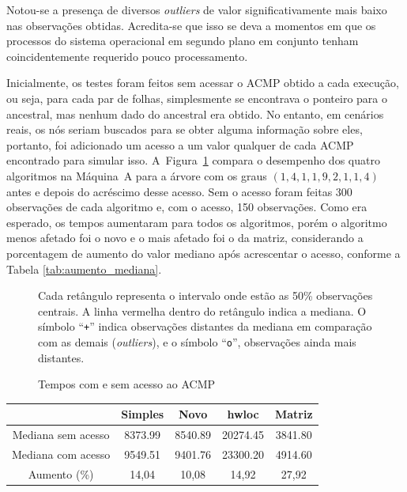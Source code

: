 
Notou-se a presença de diversos \textit{outliers} de valor significativamente mais baixo nas observações obtidas.
Acredita-se que isso se deva a momentos em que os processos do sistema operacional em segundo plano em conjunto tenham coincidentemente requerido pouco processamento.

Inicialmente, os testes foram feitos sem acessar o ACMP obtido a cada execução, ou seja, para cada par de folhas, simplesmente se encontrava o ponteiro para o ancestral, mas nenhum dado do ancestral era obtido.
No entanto, em cenários reais, os nós seriam buscados para se obter alguma informação sobre eles, portanto, foi adicionado um acesso a um valor qualquer de cada ACMP encontrado para simular isso.
A~Figura~\ref{fig:box_sem_com} compara o desempenho dos quatro algoritmos na Máquina~A para a árvore com os graus $(1, 4, 1, 1, 9, 2, 1, 1, 4)$ antes e depois do acréscimo desse acesso.
Sem o acesso foram feitas 300 observações de cada algoritmo e, com o acesso, 150 observações.
Como era esperado, os tempos aumentaram para todos os algoritmos, porém o algoritmo menos afetado foi o novo e o mais afetado foi o da matriz, considerando a porcentagem de aumento do valor mediano após acrescentar o acesso, conforme a Tabela \ref{tab:aumento_mediana}.

\begin{figure}[h]
	\caption{Tempos com e sem acesso ao ACMP}
	\label{fig:box_sem_com}
	\resizebox{\textwidth}{!}{}
	Cada retângulo representa o intervalo onde estão as 50\% observações centrais.
	A linha vermelha dentro do retângulo indica a mediana.
	O símbolo ``\texttt{+}'' indica observações distantes da mediana em comparação com as demais (\textit{outliers}), e o símbolo ``\texttt{o}'', observações ainda mais distantes.
\end{figure}

\begin{table}[htb]
	{\begin{tabular}{ccccc}
		\toprule
		& Simples & Novo & hwloc & Matriz \\
		\midrule 
		Mediana sem acesso & 8373.99 & 8540.89 & 20274.45 & 3841.80 \\
		Mediana com acesso & 9549.51 & 9401.76 & 23300.20 & 4914.60 \\
		Aumento (\%)       & 14,04 & 10,08 & 14,92 & 27,92 \\
		\bottomrule
	\end{tabular}}{}%
\end{table}



